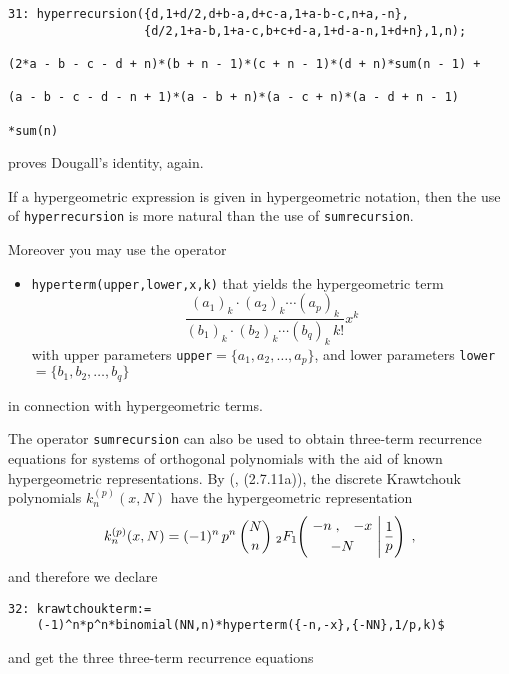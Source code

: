 {\small
\begin{verbatim}
31: hyperrecursion({d,1+d/2,d+b-a,d+c-a,1+a-b-c,n+a,-n},
                   {d/2,1+a-b,1+a-c,b+c+d-a,1+d-a-n,1+d+n},1,n);

(2*a - b - c - d + n)*(b + n - 1)*(c + n - 1)*(d + n)*sum(n - 1) +

(a - b - c - d - n + 1)*(a - b + n)*(a - c + n)*(a - d + n - 1)

*sum(n)
\end{verbatim}
}\noindent
proves Dougall's identity, again.

If a hypergeometric expression is given in hypergeometric notation, then
the use of {\tt hyperrecursion} is more natural than the use of
{\tt sumrecursion}.

Moreover you may use the \REDUCE{} operator
\begin{itemize}
\item
{\tt hyperterm(upper,lower,x,k)} that yields the hypergeometric term
\[
\frac
{(a_{1})_{k}\cdot(a_{2})_{k}\cdots(a_{p})_{k}}
{(b_{1})_{k}\cdot(b_{2})_{k}\cdots(b_{q})_{k}\,k!}x^{k}
\]
with upper parameters {\tt upper}$=\{a_{1}, a_{2}, \ldots, a_{p}\}$,
and lower parameters {\tt lower}$=\{b_{1}, b_{2}, \ldots, b_{q}\}$
\end{itemize}
in connection with hypergeometric terms.

The operator {\tt sumrecursion} can also be used to
obtain three-term recurrence equations for systems of orthogonal polynomials
with the aid of known hypergeometric representations. By
(\cite{NSU}, (2.7.11a)), the discrete Krawtchouk polynomials $k_n^{(p)}(x,N)$
have the hypergeometric representation
\[
k_n^{(p)}(x,N)=
(-1)^n\,p^n\,{{N}\choose{n}}\;
_2 F_1\left.
\!\!
\left(
\!\!\!\!
\begin{array}{c}
\multicolumn{1}{c}{\begin{array}{cc} -n\;, & -x \end{array}}\\[1mm]
\multicolumn{1}{c}{ -N}
            \end{array}
\!\!\!\!
\right| \frac{1}{p}\right)
\;,
\]
and therefore we declare

{\small
\begin{verbatim}
32: krawtchoukterm:=
    (-1)^n*p^n*binomial(NN,n)*hyperterm({-n,-x},{-NN},1/p,k)$
\end{verbatim}
}\noindent
and get the three three-term recurrence equations

